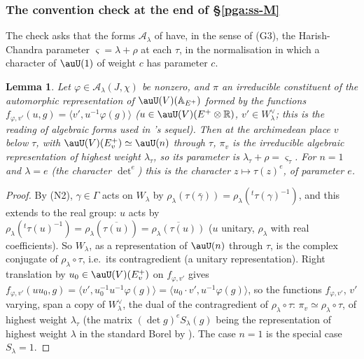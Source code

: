 \documentclass[10pt]{amsart}
\newtheorem{lemma}[theorem]{Lemma}
\theoremstyle{definition}
\theoremstyle{remark}
\newcommand{\R}{\mathbb R}
\begin{document}
\subsubsection{The convention check at the end of \S\ref{pga:ss-M}}\label{pax:ss-conv}

The check asks that the forms $\mathcal A_\lambda$ of {\cite[\S14.3]{P46}} have, in the sense of (G3),
the Harish-Chandra parameter $\varsigma=\lambda+\rho$ at each $\tau$, in the normalisation in which a
character of $\auU(1)$ of weight $c$ has parameter $c$.

\begin{lemma}\label{pax:conv}
Let $\varphi\in\mathcal A_\lambda(J,\chi)$ be nonzero, and $\pi$ an irreducible constituent of the
automorphic representation of $\auU(V)(\mathbb A_{E^+})$ formed by the functions $f_{\varphi,v'}(u,g)
=\langle v',u^{-1}\varphi(g)\rangle$ ($u\in\auU(V)(E^+\otimes\R)$, $v'\in W_\lambda^\vee$; this is the
reading of algebraic forms used in {\cite[Lemma~5.26]{P53}}'s sequel). Then at the archimedean place
$v$ below $\tau$, with $\auU(V)(E^+_v)\simeq\auU(n)$ through $\tau$, $\pi_v$ is the irreducible algebraic
representation of highest weight $\lambda_\tau$, so its parameter is $\lambda_\tau+\rho=\varsigma_\tau$.
For $n=1$ and $\lambda=e$ (the character $\det^e$) this is the character $z\mapsto\tau(z)^e$, of
parameter $e$.
\end{lemma}
\begin{proof}
By (N2), $\gamma\in\Gamma$ acts on $W_\lambda$ by $\rho_\lambda(\tau(\bar\gamma))=\rho_\lambda({}^t
\tau(\gamma)^{-1})$, and this extends to the real group: $u$ acts by $\rho_\lambda({}^t\tau(u)^{-1})=
\rho_\lambda(\overline{\tau(u)})=\overline{\rho_\lambda(\tau(u))}$ ($u$ unitary, $\rho_\lambda$ with real
coefficients). So $W_\lambda$, as a representation of $\auU(n)$ through $\tau$, is the complex
conjugate of $\rho_\lambda\circ\tau$, i.e.\ its contragredient (a unitary representation). Right
translation by $u_0\in\auU(V)(E^+_v)$ on $f_{\varphi,v'}$ gives $f_{\varphi,v'}(uu_0,g)=\langle v',u_0^{-1}
u^{-1}\varphi(g)\rangle=\langle u_0\cdot v',u^{-1}\varphi(g)\rangle$, so the functions $f_{\varphi,v'}$,
$v'$ varying, span a copy of $W_\lambda^\vee$, the dual of the contragredient of $\rho_\lambda\circ\tau$:
$\pi_v\simeq\rho_\lambda\circ\tau$, of highest weight $\lambda_\tau$ (the matrix $(\det g)^eS_\lambda(g)$
being the representation of highest weight $\lambda$ in the standard Borel by {\cite[(60)]{P49}}). The
case $n=1$ is the special case $S_\lambda=1$.
\end{proof}
\end{document}
